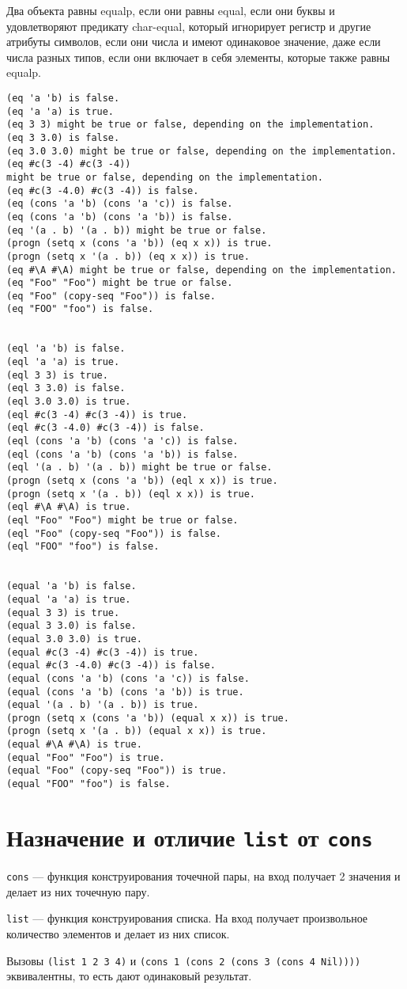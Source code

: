 Два объекта равны equalp, если они равны equal, если они буквы и удовлетворяют предикату char-equal, который игнорирует регистр и другие атрибуты символов, если они числа и имеют одинаковое значение, даже если числа разных типов, если они включает в себя элементы, которые также равны equalp.
\begin{lstlisting}[label=a80, caption={Примеры}]
(eq 'a 'b) is false. 
(eq 'a 'a) is true. 
(eq 3 3) might be true or false, depending on the implementation. 
(eq 3 3.0) is false. 
(eq 3.0 3.0) might be true or false, depending on the implementation. 
(eq #c(3 -4) #c(3 -4)) 
might be true or false, depending on the implementation. 
(eq #c(3 -4.0) #c(3 -4)) is false. 
(eq (cons 'a 'b) (cons 'a 'c)) is false. 
(eq (cons 'a 'b) (cons 'a 'b)) is false. 
(eq '(a . b) '(a . b)) might be true or false. 
(progn (setq x (cons 'a 'b)) (eq x x)) is true. 
(progn (setq x '(a . b)) (eq x x)) is true. 
(eq #\A #\A) might be true or false, depending on the implementation. 
(eq "Foo" "Foo") might be true or false. 
(eq "Foo" (copy-seq "Foo")) is false. 
(eq "FOO" "foo") is false.


(eql 'a 'b) is false. 
(eql 'a 'a) is true. 
(eql 3 3) is true. 
(eql 3 3.0) is false. 
(eql 3.0 3.0) is true. 
(eql #c(3 -4) #c(3 -4)) is true. 
(eql #c(3 -4.0) #c(3 -4)) is false. 
(eql (cons 'a 'b) (cons 'a 'c)) is false. 
(eql (cons 'a 'b) (cons 'a 'b)) is false. 
(eql '(a . b) '(a . b)) might be true or false. 
(progn (setq x (cons 'a 'b)) (eql x x)) is true. 
(progn (setq x '(a . b)) (eql x x)) is true. 
(eql #\A #\A) is true. 
(eql "Foo" "Foo") might be true or false. 
(eql "Foo" (copy-seq "Foo")) is false. 
(eql "FOO" "foo") is false.


(equal 'a 'b) is false. 
(equal 'a 'a) is true. 
(equal 3 3) is true. 
(equal 3 3.0) is false. 
(equal 3.0 3.0) is true. 
(equal #c(3 -4) #c(3 -4)) is true. 
(equal #c(3 -4.0) #c(3 -4)) is false. 
(equal (cons 'a 'b) (cons 'a 'c)) is false. 
(equal (cons 'a 'b) (cons 'a 'b)) is true. 
(equal '(a . b) '(a . b)) is true. 
(progn (setq x (cons 'a 'b)) (equal x x)) is true. 
(progn (setq x '(a . b)) (equal x x)) is true. 
(equal #\A #\A) is true. 
(equal "Foo" "Foo") is true. 
(equal "Foo" (copy-seq "Foo")) is true. 
(equal "FOO" "foo") is false.
\end{lstlisting}


\section{Назначение и отличие \texttt{list} от \texttt{cons}}

\texttt{cons} --- функция конструирования точечной пары, на вход получает 2 значения и делает из них точечную пару.

\texttt{list} --- функция конструирования списка. На вход получает произвольное количество элементов и делает из них список.

Вызовы \texttt{(list 1 2 3 4)} и \texttt{(cons 1 (cons 2 (cons 3 (cons 4 Nil))))} эквивалентны, то есть дают одинаковый результат.

